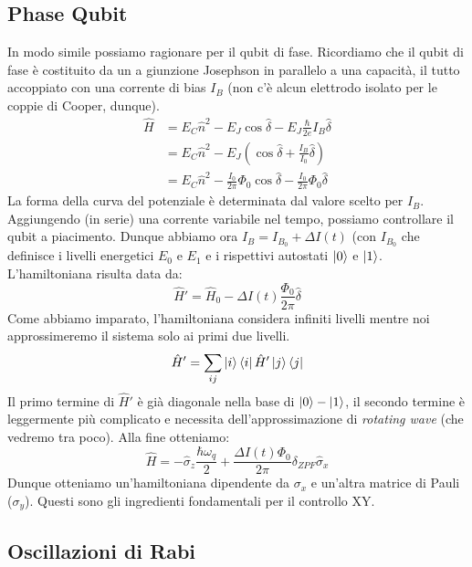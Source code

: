 \subsection{Phase Qubit}
In modo simile possiamo ragionare per il qubit di fase. Ricordiamo che il qubit di fase è costituito da un a giunzione Josephson in parallelo a una capacità, il tutto accoppiato con una corrente di bias $I_B$ (non c'è alcun elettrodo isolato per le coppie di Cooper, dunque).
\begin{equation*}
    \begin{aligned}
        \hat H &= E_C \hat{n}^2 - E_J \cos {\hat \delta} - E_J\frac{\hbar}{2e} I_B \hat \delta \\
        &=E_C\hat{n}^2-E_J\left(\cos\hat\delta+\frac{I_B}{I_0}\hat \delta\right) \\
        &= E_C \hat{n}^2 - \frac{I_0}{2\pi}\Phi _0 \cos{\hat \delta}- \frac{I_0}{2\pi}\Phi_0 \hat \delta
    \end{aligned}
\end{equation*}
La forma della curva del potenziale è determinata dal valore scelto per $I_B$. Aggiungendo (in serie) una corrente variabile nel tempo, possiamo controllare il qubit a piacimento.
Dunque abbiamo ora $I_B=I_{B_0}+\Delta I(t)$ (con $I_{B_0}$ che definisce i livelli energetici $E_0$ e $E_1$ e i rispettivi autostati $\ket 0$ e $\ket 1$.
L'hamiltoniana risulta data da:
\begin{equation*}
    \hat H' = \hat H_0 - \Delta I (t) \frac{\Phi_0}{2\pi}\hat \delta
\end{equation*}
Come abbiamo imparato, l'hamiltoniana considera infiniti livelli mentre noi approssimeremo il sistema solo ai primi due livelli.
\begin{equation*}
    \hat H' = \sum_{ij}\ket{i}\bra{i}\hat H'\ket{j}\bra{j}
\end{equation*}
Il primo termine di $\hat H'$ è già diagonale nella base di $\ket 0-\ket 1$, il secondo termine è leggermente più complicato e necessita dell'approssimazione di \textit{rotating wave} (che vedremo tra poco).
Alla fine otteniamo:
\begin{equation*}
    \hat H = - \hat\sigma_z\frac{\hbar\omega_q}{2}+\frac{\Delta I(t)\Phi_0}{2\pi}\delta_{ZPF}\hat\sigma_x
\end{equation*}
Dunque otteniamo un'hamiltoniana dipendente da $\sigma_x$ e un'altra matrice di Pauli ($\sigma_y$). Questi sono gli ingredienti fondamentali per il controllo XY.

\subsection{Oscillazioni di Rabi}

